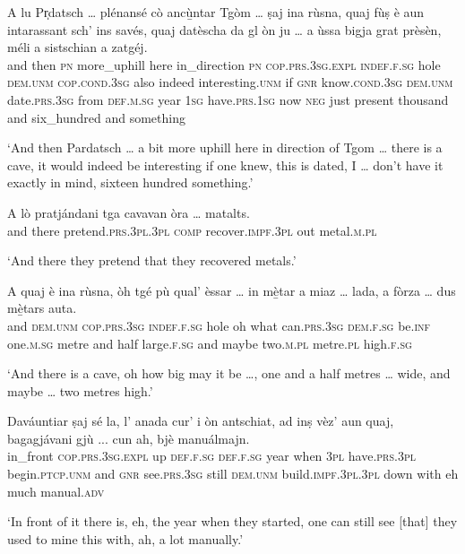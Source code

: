 \begin{linenumbers}
\gll A lu Pr̩datsch … plénansé cò ancù̱ntar Tgòm … ṣaj ina rùsna, quaj fùṣ è aun intarassant sch’ ins savés, quaj datèscha da gl òn ju … a ùssa bigja grat prèsèn, méli a sistschian a zatgéj.   \\
and then \textsc{pn} {} more\_uphill here in\_direction \textsc{pn} {} \textsc{cop.prs.3sg.expl} \textsc{indef.f.sg} hole \textsc{dem.unm} \textsc{cop.cond.3sg} also indeed interesting.\textsc{unm} if \textsc{gnr} know.\textsc{cond.3sg} \textsc{dem.unm} date.\textsc{prs.3sg} from \textsc{def.m.sg} year \textsc{1sg} {} have.\textsc{prs.1sg} now \textsc{neg} just present thousand and six\_hundred and something\\
\end{linenumbers}
\medskip
\glt `And then Pardatsch … a bit more uphill here in direction of Tgom … there is a cave, it would indeed be interesting if one knew, this is dated, I … don't have it exactly in mind, sixteen hundred something.'
\medskip

\begin{linenumbers}
\gll  A lò pratjándani tga cavavan òra … matalts.  \\
and there pretend.\textsc{prs.3pl.3pl} \textsc{comp} recover.\textsc{impf.3pl} out {} metal.\textsc{m.pl}\\
\end{linenumbers}
\medskip
\glt `And there they pretend that they recovered metals.'
\medskip

\begin{linenumbers}
\gll A quaj è ina rùsna, òh tgé pù qual' èssar … in mè̱tar a miaz … lada, a fòrza … dus mè̱tars auta.   \\
and \textsc{dem.unm} \textsc{cop.prs.3sg} \textsc{indef.f.sg} hole oh what  can.\textsc{prs.3sg} \textsc{dem.f.sg} be.\textsc{inf} {} one.\textsc{m.sg} metre and half {} large.\textsc{f.sg} and maybe {} two.\textsc{m.pl} metre.\textsc{pl} high.\textsc{f.sg}\\
\end{linenumbers}
\medskip
\glt `And there is a cave, oh how big may it be …, one and a half metres … wide, and maybe … two metres high.'
\medskip

\begin{linenumbers}
\gll Daváuntiar ṣaj sé la, l’ anada cur' i òn antschiat, ad inṣ vèz’ aun quaj, bagagjávani gjù ... cun ah, bjè manuálmajn.   \\
in\_front  \textsc{cop.prs.3sg.expl} up \textsc{def.f.sg} \textsc{def.f.sg} year when \textsc{3pl} have.\textsc{prs.3pl} begin.\textsc{ptcp.unm} and \textsc{gnr}  see.\textsc{prs.3sg} still  \textsc{dem.unm} build.\textsc{impf.3pl.3pl} down {} with eh much manual.\textsc{adv}\\
\end{linenumbers}
\medskip
\glt `In front of it there is, eh, the year when they started, one can still see [that] they used to mine this with, ah, a lot manually.'
\medskip

